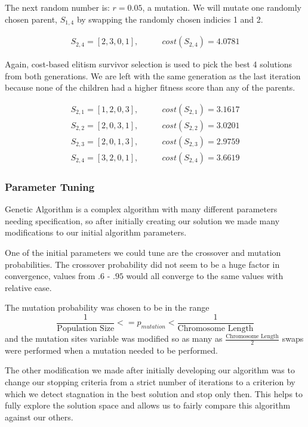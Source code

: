\documentclass[a4paper]{article}
\begin{document}
The next random number is: $r=0.05$, a mutation. We will mutate one randomly chosen parent, $S_{1,4}$ by swapping the randomly chosen indicies 1 and 2.

\begin{align*}
S_{2,4} = [2, 3, 0, 1], & \qquad cost(S_{2,4}) = 4.0781
\end{align*}

Again, cost-based elitism survivor selection is used to pick the best 4 solutions from both generations. We are left with the same generation as the last iteration because none of the children had a higher fitness score than any of the parents.

\begin{align*}
S_{2,1} = [1, 2, 0, 3], & \qquad cost(S_{2,1}) = 3.1617 \\
S_{2,2} = [2, 0, 3, 1], & \qquad cost(S_{2,2}) = 3.0201 \\
S_{2,3} = [2, 0, 1, 3], & \qquad cost(S_{2,3}) = 2.9759 \\
S_{2,4} = [3, 2, 0, 1], & \qquad cost(S_{2,4}) = 3.6619
\end{align*}

\subsubsection{Parameter Tuning}

Genetic Algorithm is a complex algorithm with many different parameters needing specification, so after initially creating our solution we made many modifications to our initial algorithm parameters.

One of the initial parameters we could tune are the crossover and mutation probabilities. The crossover probability did not seem to be a huge factor in convergence, values from $.6$ - $.95$ would all converge to the same values with relative ease.

The mutation probability was chosen to be in the range $$\frac{1}{\text{Population Size}} <= p_\mathit{mutation} < \frac{1}{\text{Chromosome Length}}$$ and the mutation sites variable was modified so as many as $\frac{\text{Chromosome Length}}{2}$ swaps were performed when a mutation needed to be performed.

The other modification we made after initially developing our algorithm was to change our stopping criteria from a strict number of iterations to a criterion by which we detect stagnation in the best solution and stop only then. This helps to fully explore the solution space and allows us to fairly compare this algorithm against our others.
\end{document}
